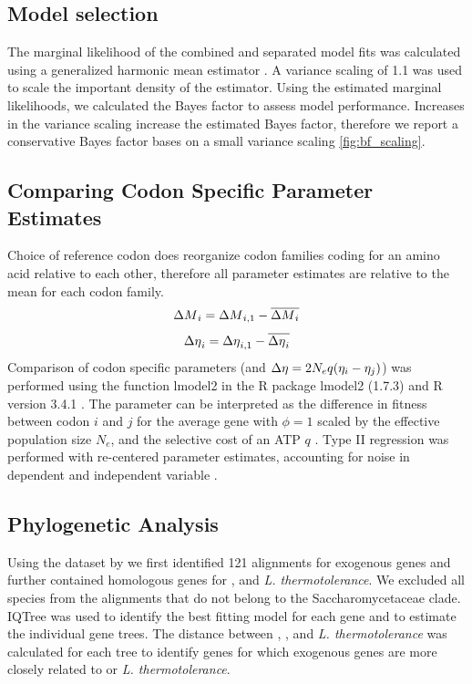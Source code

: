 \documentclass[fleqn,letterpaper]{article}
\begin{document}
\subsection*{Model selection}
The marginal likelihood of the combined and separated model fits was calculated using a generalized harmonic mean estimator \citep{Gronau2017}. A variance scaling of 1.1 was used to scale the important density of the estimator. Using the estimated marginal likelihoods, we calculated the Bayes factor to assess model performance. 
Increases in the variance scaling increase the estimated Bayes factor, therefore we report a conservative Bayes factor bases on a small variance scaling \ref{fig:bf_scaling}.

\subsection*{Comparing Codon Specific Parameter Estimates}
Choice of reference codon does reorganize codon families coding for an amino acid relative to each other, therefore all parameter estimates are relative to the mean for each codon family.
\begin{equation}
{\Delta M}_i = {\Delta M}_{i,1} - \overline{{\Delta M}_i}
\end{equation}
\begin{equation}
{\Delta \eta}_i = {\Delta \eta}_{i,1} - \overline{{\Delta \eta}_i}
\end{equation}
Comparison of codon specific parameters (\DM and ${\Delta \eta} = 2N_eq(\eta_i-\eta_j)$) was performed using the function lmodel2 in the R package lmodel2 (1.7.3) \citep{lmodel2} and R version 3.4.1 \citep{rcore}.
The parameter \DE can be interpreted as the difference in fitness between codon $i$ and $j$ for the average gene with $\phi = 1$ scaled by the  effective population size $N_e$, and the selective cost of an ATP $q$ \citep{gilchrist2007, gilchrist2015}.
Type II regression was performed with re-centered parameter estimates, accounting for noise in dependent and independent variable \citep{SokalAndRohlf1981}.

\subsection*{Phylogenetic Analysis}
Using the dataset by \citet{shen2018} we first identified 121 alignments for exogenous genes and further contained homologous genes for \gossypii, and \textit{L. thermotolerance}.
We excluded all species from the alignments that do not belong to the Saccharomycetaceae clade. 
IQTree \citep{nguyen2015} was used to identify the best fitting model for each gene and to estimate the individual gene trees.
The distance between \kluyveri, \gossypii, and \textit{L. thermotolerance} was calculated for each tree to identify genes for which exogenous genes are more closely related to \gossypii or  \textit{L. thermotolerance}.
\end{document}
